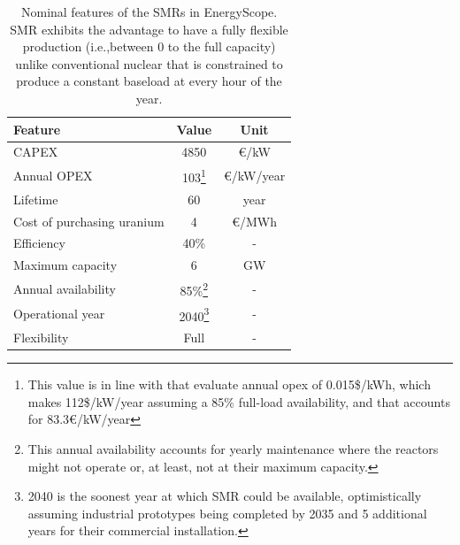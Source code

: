 \documentclass[11pt,twoside,a4paper,english]{article}
\def\ie{i.e.,}
\begin{document}
\begin{appendices}
\begin{table}[htbp!]
\caption{Nominal features of the SMRs in EnergyScope. \gls{SMR} exhibits the advantage to have a fully flexible production (\ie between 0 to the full capacity) unlike conventional nuclear that is constrained to produce a constant baseload at every hour of the year.}
\label{tab:SMR_features}
\begin{minipage}{\linewidth}
\centering
\begin{tabular}{l c c}
\toprule
\textbf{Feature} & \textbf{Value} & \textbf{Unit}\\
\midrule
CAPEX & 4850 & €/kW \\
Annual OPEX & 103\footnote{\label{foot:c_maint_SMR}This value is in line with \citet{smr_canada} that evaluate annual opex of 0.015\$/kWh, which makes 112\$/kW/year assuming a 85\% full-load availability, and \citet{PATHS2050} that accounts for 83.3€/kW/year} & €/kW/year \\
Lifetime & 60 & year \\
Cost of purchasing uranium & 4 & €/MWh\\
Efficiency & 40\% & -\\
Maximum capacity & 6 & GW \\
Annual availability & 85\%\footnote{\label{foot:avail_SMR}This annual availability accounts for yearly maintenance where the reactors might not operate or, at least, not at their maximum capacity. } & -\\
Operational year & 2040\footnote{\label{foot:op_year_SMR}2040 is the soonest year at which \gls{SMR} could be available, optimistically assuming industrial prototypes being completed by 2035 and 5 additional years for their commercial installation.} & - \\
Flexibility & Full & - \\
\bottomrule							

\end{tabular}
\end{minipage}
\end{table}


\end{appendices}
\end{document}
